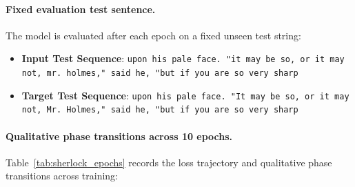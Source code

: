 \documentclass[../../main.tex]{subfiles}
\begin{document}
\paragraph{Fixed evaluation test sentence.}
The model is evaluated after each epoch on a fixed unseen test string:
\begin{itemize}
    \item \textbf{Input Test Sequence}: \texttt{upon his pale face. "it may be so, or it may not, mr. holmes," said he, "but if you are so very sharp}
    \item \textbf{Target Test Sequence}: \texttt{upon his pale face. "It may be so, or it may not, Mr. Holmes," said he, "but if you are so very sharp}
\end{itemize}

\paragraph{Qualitative phase transitions across 10 epochs.}
Table~\ref{tab:sherlock_epochs} records the loss trajectory and qualitative phase transitions across training:
\end{document}
